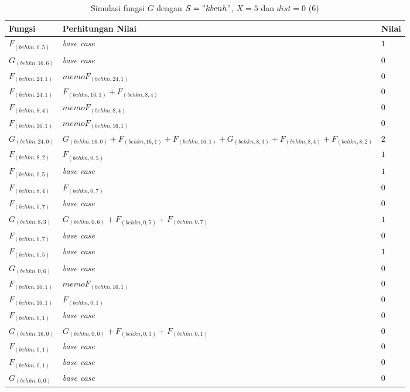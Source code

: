 \begin{table}
	\centering
	\begin{tabular} {|p{3cm}|p{5cm}|p{1cm}|} \hline
		Fungsi & Perhitungan Nilai & Nilai \\ \hline
		$ F_{(behkn, 0, 5)} $ & \textit{base case} & $ 1 $ \\ \hline
		$ G_{(behkn, 16, 6)} $ & \textit{base case} & $ 0 $ \\ \hline
		$ F_{(behkn, 24, 1)}  $ & $memoF_{(behkn, 24, 1)}$ & $ 0 $ \\ \hline
		$ F_{(behkn, 24, 1)}  $ & $F_{(behkn, 16, 1)} + F_{(behkn, 8, 4)}$ & $ 0 $ \\ \hline
		$ F_{(behkn, 8, 4)}  $ & $memoF_{(behkn, 8, 4)}$ & $ 0 $ \\ \hline
		$ F_{(behkn, 16, 1)}  $ & $memoF_{(behkn, 16, 1)}$ & $ 0 $ \\ \hline
		$ G_{(behkn, 24, 0)}  $ & $G_{(behkn, 16, 0)} + F_{(behkn, 16, 1)} + F_{(behkn, 16, 1)} + G_{(behkn, 8, 3)} + F_{(behkn, 8, 4)} + F_{(behkn, 8, 2)}$ & $ 2 $ \\ \hline
		$ F_{(behkn, 8, 2)}  $ & $F_{(behkn, 0, 5)}$ & $ 1 $ \\ \hline
		$ F_{(behkn, 0, 5)} $ & \textit{base case} & $ 1 $ \\ \hline
		$ F_{(behkn, 8, 4)}  $ & $F_{(behkn, 0, 7)}$ & $ 0 $ \\ \hline
		$ F_{(behkn, 0, 7)} $ & \textit{base case} & $ 0 $ \\ \hline
		$ G_{(behkn, 8, 3)}  $ & $G_{(behkn, 0, 6)} + F_{(behkn, 0, 5)} + F_{(behkn, 0, 7)}$ & $ 1 $ \\ \hline
		$ F_{(behkn, 0, 7)} $ & \textit{base case} & $ 0 $ \\ \hline
		$ F_{(behkn, 0, 5)} $ & \textit{base case} & $ 1 $ \\ \hline
		$ G_{(behkn, 0, 6)} $ & \textit{base case} & $ 0 $ \\ \hline
		$ F_{(behkn, 16, 1)}  $ & $memoF_{(behkn, 16, 1)}$ & $ 0 $ \\ \hline
		$ F_{(behkn, 16, 1)}  $ & $F_{(behkn, 0, 1)}$ & $ 0 $ \\ \hline
		$ F_{(behkn, 0, 1)} $ & \textit{base case} & $ 0 $ \\ \hline
		$ G_{(behkn, 16, 0)}  $ & $G_{(behkn, 0, 0)} + F_{(behkn, 0, 1)} + F_{(behkn, 0, 1)}$ & $ 0 $ \\ \hline
		$ F_{(behkn, 0, 1)} $ & \textit{base case} & $ 0 $ \\ \hline
		$ F_{(behkn, 0, 1)} $ & \textit{base case} & $ 0 $ \\ \hline
		$ G_{(behkn, 0, 0)} $ & \textit{base case} & $ 0 $ \\ \hline
	\end{tabular}\caption{Simulasi fungsi $ G $ dengan $ S="kbenh" $, $ X=5 $ dan $ dist= 0$ (6)}
	\label{tab:simulasi_G_6}
\end{table}

